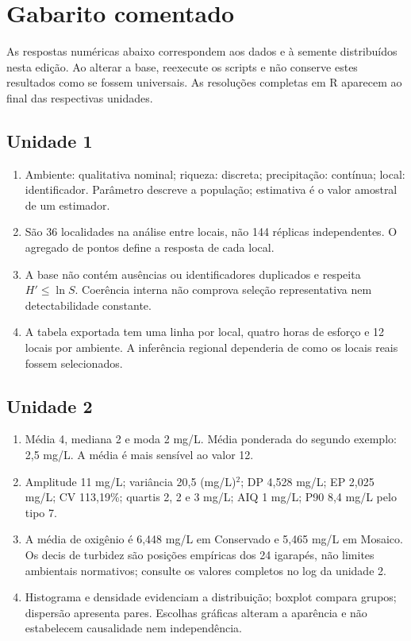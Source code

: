 \chapter{Gabarito comentado}
As respostas numéricas abaixo correspondem aos dados e à semente distribuídos nesta edição. Ao alterar a base, reexecute os scripts e não conserve estes resultados como se fossem universais. As resoluções completas em R aparecem ao final das respectivas unidades.

\section*{Unidade 1}
\begin{enumerate}
\item Ambiente: qualitativa nominal; riqueza: discreta; precipitação: contínua; local: identificador. Parâmetro descreve a população; estimativa é o valor amostral de um estimador.
\item São 36 localidades na análise entre locais, não 144 réplicas independentes. O agregado de pontos define a resposta de cada local.
\item A base não contém ausências ou identificadores duplicados e respeita $H'\leq\ln S$. Coerência interna não comprova seleção representativa nem detectabilidade constante.
\item A tabela exportada tem uma linha por local, quatro horas de esforço e 12 locais por ambiente. A inferência regional dependeria de como os locais reais fossem selecionados.
\end{enumerate}

\section*{Unidade 2}
\begin{enumerate}
\item Média 4, mediana 2 e moda 2 mg/L. Média ponderada do segundo exemplo: 2,5 mg/L. A média é mais sensível ao valor 12.
\item Amplitude 11 mg/L; variância 20,5 (mg/L)$^2$; DP 4,528 mg/L; EP 2,025 mg/L; CV 113,19\%; quartis 2, 2 e 3 mg/L; AIQ 1 mg/L; P90 8,4 mg/L pelo tipo 7.
\item A média de oxigênio é 6,448 mg/L em Conservado e 5,465 mg/L em Mosaico. Os decis de turbidez são posições empíricas dos 24 igarapés, não limites ambientais normativos; consulte os valores completos no log da unidade 2.
\item Histograma e densidade evidenciam a distribuição; boxplot compara grupos; dispersão apresenta pares. Escolhas gráficas alteram a aparência e não estabelecem causalidade nem independência.
\end{enumerate}

